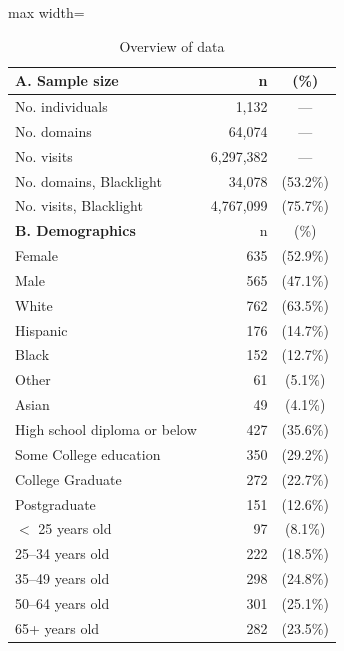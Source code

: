 \documentclass[12pt, letterpaper]{article}
\begin{document}
\begin{table}[ht]
\captionsetup{justification=centering} %
\centering
\footnotesize
\setlength\tabcolsep{6 pt}
\setlength{\defaultaddspace}{0pt}
\def\sym#1{\ifmmode^{#1}\else\(^{#1}\)\fi}
\caption{Overview of data}
\label{tab:demo_summary}
\begin{adjustbox}{max width=\textwidth}
\begin{tabular}{@{\hspace{0\tabcolsep}}lrc@{\hspace{0\tabcolsep}}}
    \toprule\toprule
    \textbf{A. Sample size} & n & (\%)\\
    \midrule
    No. individuals & 1,132 & --- \\
    No. domains & 64,074 & ---\\
    No. visits & 6,297,382 & ---\\
    No. domains, Blacklight & 34,078 & (53.2\%) \\
    No. visits, Blacklight & 4,767,099 & (75.7\%) \\
    \midrule
    \textbf{B. Demographics} & n & (\%)\\
    \midrule
    
Female & 635 & (52.9\%) \\
Male & 565 & (47.1\%) \\
White & 762 & (63.5\%) \\
Hispanic & 176 & (14.7\%) \\
Black & 152 & (12.7\%) \\
Other & 61 & (5.1\%) \\
Asian & 49 & (4.1\%) \\
High school diploma or below & 427 & (35.6\%) \\
Some College education & 350 & (29.2\%) \\
College Graduate & 272 & (22.7\%) \\
Postgraduate & 151 & (12.6\%) \\
$<$ 25 years old & 97 & (8.1\%) \\
25--34 years old & 222 & (18.5\%) \\
35--49 years old & 298 & (24.8\%) \\
50--64 years old & 301 & (25.1\%) \\
65+ years old & 282 & (23.5\%) \\


\end{tabular}
\end{adjustbox}
\end{table}
\end{document}
